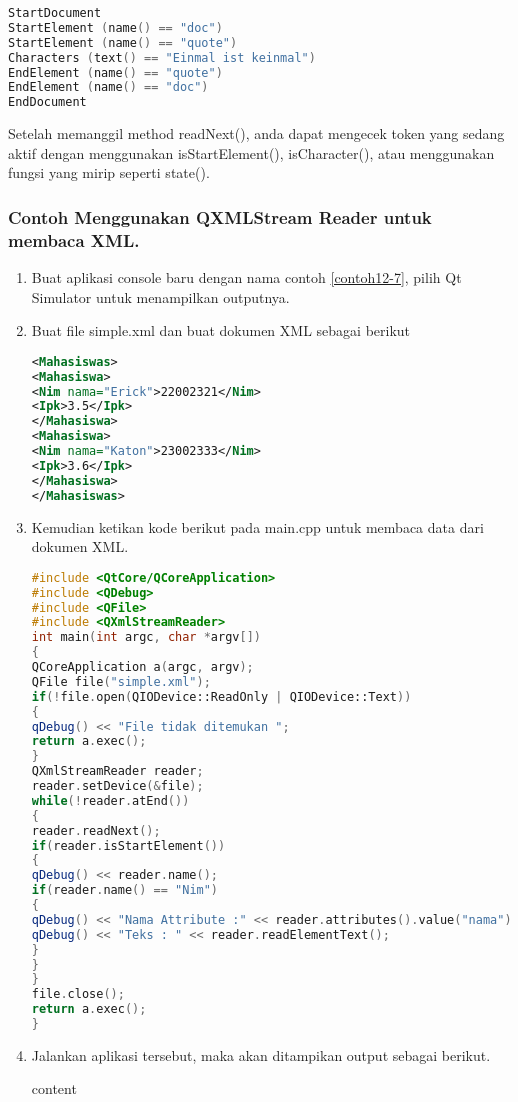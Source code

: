 \begin{lstlisting}[language=c++, numbers=none]
StartDocument
StartElement (name() == "doc")
StartElement (name() == "quote")
Characters (text() == "Einmal ist keinmal")
EndElement (name() == "quote")
EndElement (name() == "doc")
EndDocument
\end{lstlisting}

Setelah memanggil method readNext(), anda dapat mengecek token yang
sedang aktif dengan menggunakan isStartElement(), isCharacter(), atau
menggunakan fungsi yang mirip seperti state().

\subsubsection*{Contoh  Menggunakan QXMLStream Reader untuk membaca XML.}

\begin{enumerate}
\item
  Buat aplikasi console baru dengan nama contoh \ref{contoh12-7}, pilih Qt Simulator
  untuk menampilkan outputnya.
\item
  Buat file simple.xml dan buat dokumen XML sebagai berikut

\begin{lstlisting}[language=xml]
<Mahasiswas>
<Mahasiswa>
<Nim nama="Erick">22002321</Nim>
<Ipk>3.5</Ipk>
</Mahasiswa>
<Mahasiswa>
<Nim nama="Katon">23002333</Nim>
<Ipk>3.6</Ipk>
</Mahasiswa>
</Mahasiswas>
\end{lstlisting}
\item
  Kemudian ketikan kode berikut pada main.cpp untuk membaca data dari
  dokumen XML.

\begin{lstlisting}[language=c++, caption=Menggunakan QXMLStream Reader untuk membaca XML, label=contoh12-8]
#include <QtCore/QCoreApplication>
#include <QDebug>
#include <QFile>
#include <QXmlStreamReader>
int main(int argc, char *argv[])
{
QCoreApplication a(argc, argv);
QFile file("simple.xml");
if(!file.open(QIODevice::ReadOnly | QIODevice::Text))
{
qDebug() << "File tidak ditemukan ";
return a.exec();
}
QXmlStreamReader reader;
reader.setDevice(&file);
while(!reader.atEnd())
{
reader.readNext();
if(reader.isStartElement())
{
qDebug() << reader.name();
if(reader.name() == "Nim")
{
qDebug() << "Nama Attribute :" << reader.attributes().value("nama");
qDebug() << "Teks : " << reader.readElementText();
}
}
}
file.close();
return a.exec();
}
\end{lstlisting}
\item
  Jalankan aplikasi tersebut, maka akan ditampikan output sebagai
  berikut.
  \begin{lcverbatim}
  	content
  \end{lcverbatim}
\end{enumerate}

